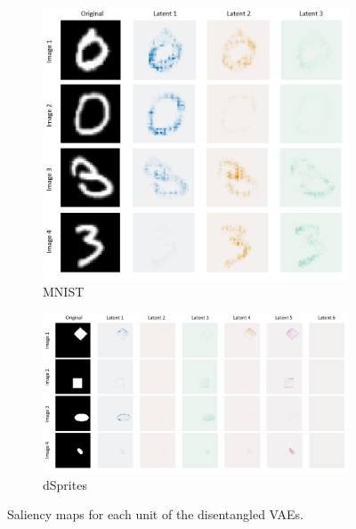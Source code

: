 \begin{figure}[H]
     \begin{subfigure}[b]{0.365\textwidth}
         \centering
         \includegraphics[width=\textwidth]{images/saliency_Mnist.png}
         \caption{MNIST}
         \label{fig:saliencyMNIST}
     \end{subfigure}
     \hfill
     \begin{subfigure}[b]{0.635\textwidth}
         \centering
         \includegraphics[width=\textwidth]{images/sasliency_dsprites.png}
         \caption{dSprites}
         \label{fig:dsprites}
     \end{subfigure}
        \caption{Saliency maps for each unit of the disentangled VAEs.}
        \label{fig:saliencyVAE}
\end{figure}

